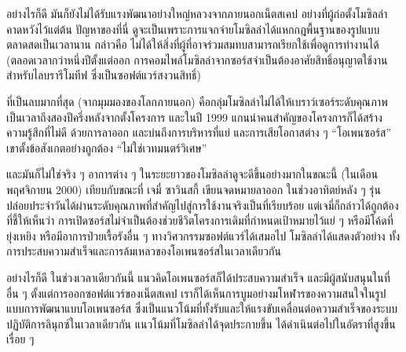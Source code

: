 อย่างไรก็ดี มันก็ยังไม่ได้รับแรงพัฒนาอย่างใหญ่หลวงจากภายนอกเน็ตสเคป
อย่างที่ผู้ก่อตั้งโมซิลล่าคาดหวังไว้แต่ต้น ปัญหาของที่นี่
ดูจะเป็นเพราะการแจกจ่ายโมซิลล่าได้แหกกฎพื้นฐานของรูปแบบตลาดสดเป็นเวลานาน
กล่าวคือ
ไม่ได้ให้สิ่งที่ผู้ที่อาจร่วมสมทบสามารถเรียกใช้เพื่อดูการทำงานได้
(ตลอดเวลากว่าหนึ่งปีตั้งแต่ออก
การคอมไพล์โมซิลล่าจากซอร์สจำเป็นต้องอาศัยสิทธิ์อนุญาตใช้งานสำหรับไลบรารีโมทีฟ
ซึ่งเป็นซอฟต์แวร์สงวนสิทธิ์)

ที่เป็นลบมากที่สุด (จากมุมมองของโลกภายนอก)
คือกลุ่มโมซิลล่าไม่ได้ให้เบราว์เซอร์ระดับคุณภาพเป็นเวลาถึงสองปีครึ่งหลังจากตั้งโครงการ
และในปี 1999 แกนนำคนสำคัญของโครงการก็ได้สร้างความรู้สึกที่ไม่ดี
ด้วยการลาออก และบ่นถึงการบริหารที่แย่ และการเสียโอกาสต่าง ๆ
``โอเพนซอร์ส'' เขาตั้งข้อสังเกตอย่างถูกต้อง ``ไม่ใช่เวทมนตร์วิเศษ''

และมันก็ไม่ใช่จริง ๆ  อาการต่าง ๆ
ในระยะยาวของโมซิลล่าดูจะดีขึ้นอย่างมากในขณะนี้ (ในเดือนพฤศจิกายน 2000)
เทียบกับขณะที่ เจมี่ ซาวินสกี้ เขียนจดหมายลาออก ในช่วงอาทิตย์หลัง ๆ
รุ่นปล่อยประจำวันได้ผ่านระดับคุณภาพที่สำคัญไปสู่การใช้งานจริงเป็นที่เรียบร้อย
แต่เจมี่ก็กล่าวได้ถูกต้อง ที่ชี้ให้เห็นว่า
การเปิดซอร์สไม่จำเป็นต้องช่วยชีวิตโครงการเดิมที่กำหนดเป้าหมายไว้แย่ ๆ
หรือมีโค้ดที่ยุ่งเหยิง หรือมีอาการป่วยเรื้อรังอื่น ๆ
ทางวิศวกรรมซอฟต์แวร์ได้เสมอไป โมซิลล่าได้แสดงตัวอย่าง
ทั้งการประสบความสำเร็จและการล้มเหลวของโอเพนซอร์สในเวลาเดียวกัน

อย่างไรก็ดี ในช่วงเวลาเดียวกันนี้ แนวคิดโอเพนซอร์สก็ได้ประสบความสำเร็จ
และมีผู้สนับสนุนในที่อื่น ๆ  ตั้งแต่การออกซอฟต์แวร์ของเน็ตสเคป
เราก็ได้เห็นการบูมอย่างมโหฬารของความสนใจในรูปแบบการพัฒนาแบบโอเพนซอร์ส
ซึ่งเป็นแนวโน้มที่ทั้งรับและให้แรงขับเคลื่อนต่อความสำเร็จของระบบปฏิบัติการลินุกซ์ในเวลาเดียวกัน
แนวโน้มที่โมซิลล่าได้จุดประกายขึ้น
ได้ดำเนินต่อไปในอัตราที่สูงขึ้นเรื่อย ๆ
